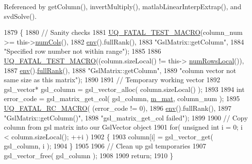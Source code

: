 Referenced by get\-Column(), invert\-Multiply(), matlab\-Linear\-Interp\-Extrap(), and svd\-Solve().


\begin{DoxyCode}
1879 \{
1880   \textcolor{comment}{// Sanity checks}
1881   \hyperlink{_defines_8h_a56d63d18d0a6d45757de47fcc06f574d}{UQ\_FATAL\_TEST\_MACRO}(column\_num >= this->\hyperlink{class_q_u_e_s_o_1_1_gsl_matrix_ad5005f168fe030468e834776afb1859b}{numCols}(),
1882                       \hyperlink{class_q_u_e_s_o_1_1_matrix_a1eefeca9f35200e8275fb0fdfa0c8684}{env}().fullRank(),
1883                       \textcolor{stringliteral}{"GslMatrix::getColumn"},
1884                       \textcolor{stringliteral}{"Specified row number not within range"});
1885 
1886   \hyperlink{_defines_8h_a56d63d18d0a6d45757de47fcc06f574d}{UQ\_FATAL\_TEST\_MACRO}((column.sizeLocal() != this->
      \hyperlink{class_q_u_e_s_o_1_1_gsl_matrix_ab5ec937a9fd439eef1a87e12c0dbccb4}{numRowsLocal}()),
1887                       \hyperlink{class_q_u_e_s_o_1_1_matrix_a1eefeca9f35200e8275fb0fdfa0c8684}{env}().\hyperlink{class_q_u_e_s_o_1_1_base_environment_a84a239e42ae443cf71db6e03e8159620}{fullRank}(),
1888                       \textcolor{stringliteral}{"GslMatrix::getColumn"},
1889                       \textcolor{stringliteral}{"column vector not same size as this matrix"});
1890 
1891   \textcolor{comment}{// Temporary working vector}
1892   gsl\_vector* gsl\_column = gsl\_vector\_alloc( column.sizeLocal() );
1893 
1894   \textcolor{keywordtype}{int} error\_code = gsl\_matrix\_get\_col( gsl\_column, \hyperlink{class_q_u_e_s_o_1_1_gsl_matrix_a2cac0bd065e280a06445f944d5f3e3b3}{m\_mat}, column\_num );
1895   \hyperlink{_defines_8h_aa9107e1a9a5197371a412db3fa349988}{UQ\_FATAL\_RC\_MACRO}( (error\_code != 0),
1896                      \hyperlink{class_q_u_e_s_o_1_1_matrix_a1eefeca9f35200e8275fb0fdfa0c8684}{env}().fullRank(),
1897                      \textcolor{stringliteral}{"GslMatrix::getColumn()"},
1898                      \textcolor{stringliteral}{"gsl\_matrix\_get\_col failed"});
1899 
1900   \textcolor{comment}{// Copy column from gsl matrix into our GslVector object}
1901   \textcolor{keywordflow}{for}( \textcolor{keywordtype}{unsigned} \textcolor{keywordtype}{int} i = 0; i < column.sizeLocal(); ++i )
1902     \{
1903       column[i] = gsl\_vector\_get( gsl\_column, i );
1904     \}
1905 
1906   \textcolor{comment}{// Clean up gsl temporaries}
1907   gsl\_vector\_free( gsl\_column );
1908 
1909   \textcolor{keywordflow}{return};
1910 \}
\end{DoxyCode}
